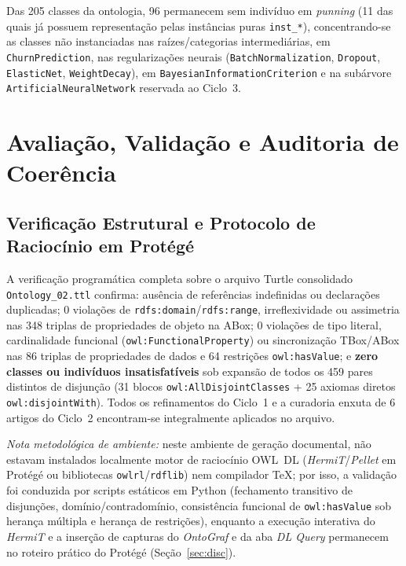 \documentclass[11pt,a4paper]{article}
\newcommand{\onto}[1]{\texttt{#1}}
\begin{document}
Das 205 classes da ontologia, 96 permanecem sem indivíduo em \emph{punning} (11 das quais já possuem representação pelas instâncias puras \onto{inst\_*}), concentrando-se as classes não instanciadas nas raízes/categorias intermediárias, em \onto{ChurnPrediction}, nas regularizações neurais (\onto{BatchNormalization}, \onto{Dropout}, \onto{ElasticNet}, \onto{WeightDecay}), em \onto{BayesianInformationCriterion} e na subárvore \onto{ArtificialNeuralNetwork} reservada ao Ciclo~3.

\section{Avaliação, Validação e Auditoria de Coerência}\label{sec:aval}

\subsection{Verificação Estrutural e Protocolo de Raciocínio em Protégé}

A verificação programática completa sobre o arquivo Turtle consolidado \texttt{Ontology\_02.ttl} confirma: ausência de referências indefinidas ou declarações duplicadas; 0 violações de \onto{rdfs:domain}/\onto{rdfs:range}, irreflexividade ou assimetria nas 348 triplas de propriedades de objeto na ABox; 0 violações de tipo literal, cardinalidade funcional (\onto{owl:FunctionalProperty}) ou sincronização TBox/ABox nas 86 triplas de propriedades de dados e 64 restrições \onto{owl:hasValue}; e \textbf{zero classes ou indivíduos insatisfatíveis} sob expansão de todos os 459 pares distintos de disjunção (31 blocos \onto{owl:AllDisjointClasses} + 25 axiomas diretos \onto{owl:disjointWith}). Todos os refinamentos do Ciclo~1 e a curadoria enxuta de 6 artigos do Ciclo~2 encontram-se integralmente aplicados no arquivo.

\emph{Nota metodológica de ambiente:} neste ambiente de geração documental, não estavam instalados localmente motor de raciocínio OWL~DL (\emph{HermiT}/\emph{Pellet} em Protégé ou bibliotecas \texttt{owlrl}/\texttt{rdflib}) nem compilador TeX; por isso, a validação foi conduzida por scripts estáticos em Python (fechamento transitivo de disjunções, domínio/contradomínio, consistência funcional de \onto{owl:hasValue} sob herança múltipla e herança de restrições), enquanto a execução interativa do \emph{HermiT} e a inserção de capturas do \emph{OntoGraf} e da aba \emph{DL Query} permanecem no roteiro prático do Protégé (Seção~\ref{sec:disc}).
\end{document}
